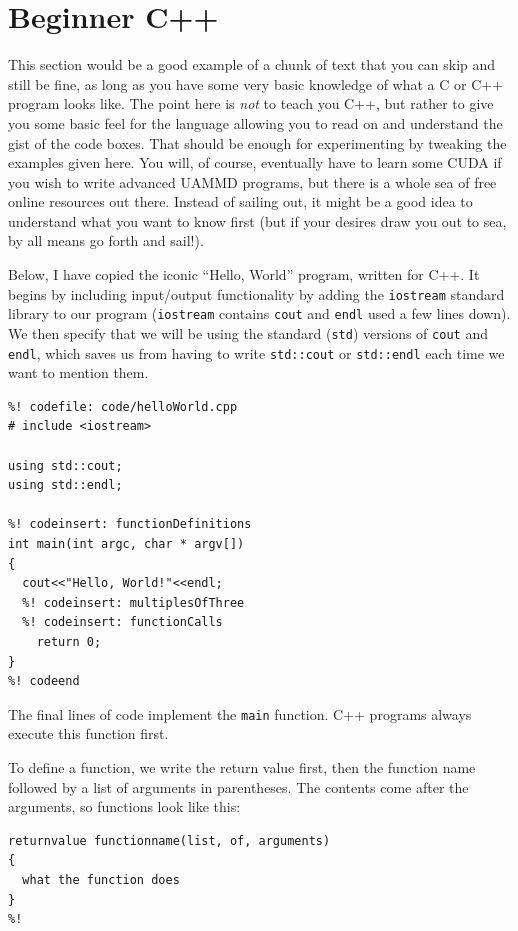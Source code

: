 \section*{Beginner C++}

This section would be a good example of a chunk of text that you can skip and 
still be fine, as long as you have some very basic knowledge of what a C or C++ 
program looks like. The point here is \textit{not} to teach you C++, but rather 
to give you some basic feel for the language allowing you to read on and 
understand the gist of the code boxes. That should be enough for experimenting 
by tweaking the examples given here. You will, of course, eventually have to 
learn some CUDA if you wish to write advanced UAMMD programs, but there is a 
whole sea of free online resources out there. Instead of sailing out, it might 
be a good idea to understand what you want to know first (but if your desires 
draw you out to sea, by all means go forth and sail!).

Below, I have copied the iconic ``Hello, World'' program, written for C++. It
begins by including input/output functionality by adding the \texttt{iostream}
standard library to our program (\texttt{iostream} contains \texttt{cout} and
\texttt{endl} used a few lines down). We then specify that we will be using
the standard (\texttt{std}) versions of \texttt{cout} and \texttt{endl}, which
saves us from having to write \texttt{std::cout} or \texttt{std::endl} each
time we want to mention them.
\begin{lstlisting}
%! codefile: code/helloWorld.cpp
# include <iostream>

using std::cout;
using std::endl;

%! codeinsert: functionDefinitions
int main(int argc, char * argv[])
{
  cout<<"Hello, World!"<<endl;
  %! codeinsert: multiplesOfThree
  %! codeinsert: functionCalls
	return 0;
}
%! codeend
\end{lstlisting}

The final lines of code implement the \texttt{main} function. C++ programs
always execute this function first.

To define a function, we write the return value first, then the function name
followed by a list of arguments in parentheses. The contents come after the
arguments, so functions look like this:
\begin{lstlisting}
returnvalue functionname(list, of, arguments)
{
  what the function does
}
%!
\end{lstlisting}

